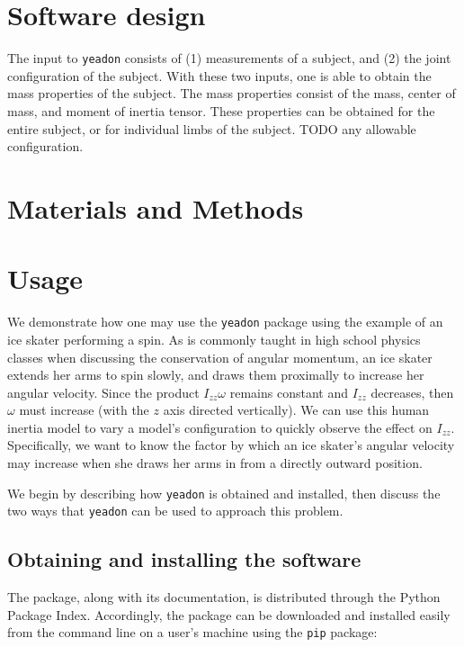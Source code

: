 \documentclass[10pt]{article}
\begin{document}
\section*{Software design}

The input to \verb+yeadon+ consists of (1) measurements of a subject, and (2)
the joint configuration of the subject. With these two inputs, one is able to
obtain the mass properties of the subject.
The mass properties consist of the mass, center of mass, and moment of inertia
tensor. These properties can be obtained for the entire subject, or for
individual limbs of the subject. TODO any allowable configuration.

\section*{Materials and Methods}

\section*{Usage}

We demonstrate how one may use the \verb+yeadon+ package using the example of
an ice skater performing a spin. As is commonly taught in high school physics
classes when discussing the conservation of angular momentum, an ice skater
extends her arms to spin slowly, and draws them proximally to increase her
angular velocity. Since the product $I_{zz}\omega$ remains constant and $I_{zz}$
decreases, then $\omega$ must increase (with the $z$ axis directed vertically).
We can use this human inertia model to vary a model's configuration to quickly
observe the effect on $I_{zz}$. Specifically, we want to know the factor by
which an ice skater's angular velocity may increase when she draws her arms in
from a directly outward position.

We begin by describing how \verb+yeadon+ is obtained and installed, then
discuss the two ways that \verb+yeadon+ can be used to approach this problem.

\subsection*{Obtaining and installing the software}

The package, along with its documentation, is distributed through the Python
Package Index. Accordingly, the package can be downloaded and installed easily
from the command line on a user's machine using the \verb+pip+ package:
\end{document}
